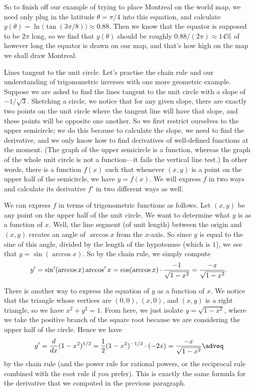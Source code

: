So to finish off our example of trying to place Montreal on the world map, we need only plug in the latitude
$\theta = \pi/4$ into this equation, and calculate $y(\theta) = \ln\bigl(\tan(3\pi/8)\bigr) \approx 0.88$.
Then we know that the equator is supposed to be $2\pi$ long, so we find that $y(\theta)$ should be roughly
$0.88/(2\pi) \approx 14\%$
of however long the equator is drawn on our map, and that's how high on the map we shall draw Montreal.

\medskip\boldlabel Lines tangent to the unit circle.
Let's practise the chain rule and our understanding of trigonometric inverses with one more geometric example.
Suppose we are asked to find the lines tangent to the unit circle with a slope of $-1/\sqrt 3$. Sketching a
circle, we notice that for any given slope, there are exactly two points on the unit circle
where the tangent line will have that slope,
and these points will be opposite one another. So we first restrict ourselves to the upper semicircle; we
do this because to calculate the slope, we need to find the derivative, and we only know how to find
derivatives of well-defined functions at the moment.
(The graph of the upper semicircle is a function, whereas the graph of the whole unit circle
is not a function---it fails the vertical line test.)
In other words, there is a function $f(x)$ such that whenever $(x,y)$ is a point on the
upper half of the semicircle, we have $y=f(x)$.
We will express $f$ in two ways and calculate its derivative $f'$ in two different ways as
well.

We can express $f$ in terms of trigonometric functions as follows. Let $(x,y)$ be any point on the upper
half of the unit circle. We want to determine what $y$ is as a function of $x$. Well,
the line segment (of unit length) between the origin and $(x,y)$ creates
an angle of $\arccos x$ from the $x$-axis. So since $y$ is equal to the sine of this angle, divided by the
length of the hypotenuse (which is $1$), we see that $y=\sin(\arccos x)$.
So by the chain rule, we simply compute
$$y' = \sin'(\arccos x)\arccos'x = \cos(\arccos x) \cdot {-1\over \sqrt{1-x^2}} = {-x\over \sqrt{1-x^2}}.$$

There is another way to express the equation of $y$ as a function of $x$. We notice that the triangle
whose vertices are $(0,0)$, $(x,0)$, and $(x,y)$ is a right triangle, so we have $x^2 + y^2 = 1$. From
here, we just isolate $y=\sqrt{1-x^2}$, where we take the positive branch of the square root because
we are considering the upper half of the circle. Hence we have
\edef\equppersemicircle{\the\eqcount}
$$y'={d\over dx} (1-x^2)^{1/2} = {1\over 2} (1-x^2)^{-1/2} \cdot (-2x) = {-x\over \sqrt{1-x^2}}\adveq$$
by the chain rule (and the power rule for rational powers, or the reciprocal rule combined with the root
rule if you prefer). This is exactly the same formula for the derivative that we computed in the previous
paragraph.


